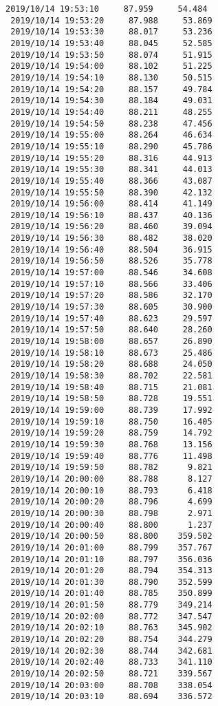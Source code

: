 \documentclass[11pt]{article}
\begin{document}
\begin{Verbatim}[commandchars=\\\{\}]
 2019/10/14 19:53:10     87.959     54.484
 2019/10/14 19:53:20     87.988     53.869
 2019/10/14 19:53:30     88.017     53.236
 2019/10/14 19:53:40     88.045     52.585
 2019/10/14 19:53:50     88.074     51.915
 2019/10/14 19:54:00     88.102     51.225
 2019/10/14 19:54:10     88.130     50.515
 2019/10/14 19:54:20     88.157     49.784
 2019/10/14 19:54:30     88.184     49.031
 2019/10/14 19:54:40     88.211     48.255
 2019/10/14 19:54:50     88.238     47.456
 2019/10/14 19:55:00     88.264     46.634
 2019/10/14 19:55:10     88.290     45.786
 2019/10/14 19:55:20     88.316     44.913
 2019/10/14 19:55:30     88.341     44.013
 2019/10/14 19:55:40     88.366     43.087
 2019/10/14 19:55:50     88.390     42.132
 2019/10/14 19:56:00     88.414     41.149
 2019/10/14 19:56:10     88.437     40.136
 2019/10/14 19:56:20     88.460     39.094
 2019/10/14 19:56:30     88.482     38.020
 2019/10/14 19:56:40     88.504     36.915
 2019/10/14 19:56:50     88.526     35.778
 2019/10/14 19:57:00     88.546     34.608
 2019/10/14 19:57:10     88.566     33.406
 2019/10/14 19:57:20     88.586     32.170
 2019/10/14 19:57:30     88.605     30.900
 2019/10/14 19:57:40     88.623     29.597
 2019/10/14 19:57:50     88.640     28.260
 2019/10/14 19:58:00     88.657     26.890
 2019/10/14 19:58:10     88.673     25.486
 2019/10/14 19:58:20     88.688     24.050
 2019/10/14 19:58:30     88.702     22.581
 2019/10/14 19:58:40     88.715     21.081
 2019/10/14 19:58:50     88.728     19.551
 2019/10/14 19:59:00     88.739     17.992
 2019/10/14 19:59:10     88.750     16.405
 2019/10/14 19:59:20     88.759     14.792
 2019/10/14 19:59:30     88.768     13.156
 2019/10/14 19:59:40     88.776     11.498
 2019/10/14 19:59:50     88.782      9.821
 2019/10/14 20:00:00     88.788      8.127
 2019/10/14 20:00:10     88.793      6.418
 2019/10/14 20:00:20     88.796      4.699
 2019/10/14 20:00:30     88.798      2.971
 2019/10/14 20:00:40     88.800      1.237
 2019/10/14 20:00:50     88.800    359.502
 2019/10/14 20:01:00     88.799    357.767
 2019/10/14 20:01:10     88.797    356.036
 2019/10/14 20:01:20     88.794    354.313
 2019/10/14 20:01:30     88.790    352.599
 2019/10/14 20:01:40     88.785    350.899
 2019/10/14 20:01:50     88.779    349.214
 2019/10/14 20:02:00     88.772    347.547
 2019/10/14 20:02:10     88.763    345.902
 2019/10/14 20:02:20     88.754    344.279
 2019/10/14 20:02:30     88.744    342.681
 2019/10/14 20:02:40     88.733    341.110
 2019/10/14 20:02:50     88.721    339.567
 2019/10/14 20:03:00     88.708    338.054
 2019/10/14 20:03:10     88.694    336.572

\end{Verbatim}
\end{document}

